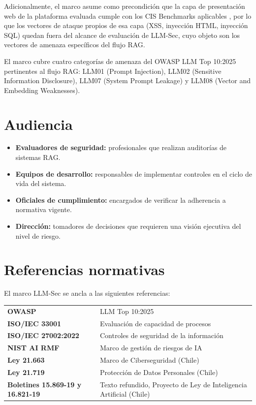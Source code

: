Adicionalmente, el marco asume como precondición que la capa de presentación web de la plataforma evaluada cumple con los CIS Benchmarks aplicables \cite{cisbenchmarks}, por lo que los vectores de ataque propios de esa capa (XSS, inyección HTML, inyección SQL) quedan fuera del alcance de evaluación de LLM-Sec, cuyo objeto son los vectores de amenaza específicos del flujo RAG.

El marco cubre cuatro categorías de amenaza del OWASP LLM Top 10:2025 pertinentes al flujo RAG: LLM01 (Prompt Injection), LLM02 (Sensitive Information Disclosure), LLM07 (System Prompt Leakage) y LLM08 (Vector and Embedding Weaknesses).

\section{Audiencia}

\begin{itemize}[leftmargin=2em]
  \item \textbf{Evaluadores de seguridad:} profesionales que realizan auditorías de sistemas RAG.
  \item \textbf{Equipos de desarrollo:} responsables de implementar controles en el ciclo de vida del sistema.
  \item \textbf{Oficiales de cumplimiento:} encargados de verificar la adherencia a normativa vigente.
  \item \textbf{Dirección:} tomadores de decisiones que requieren una visión ejecutiva del nivel de riesgo.
\end{itemize}

\section{Referencias normativas}

El marco LLM-Sec se ancla a las siguientes referencias:

\begin{infobox}[title=Referencias principales]
  \begin{tabularx}{\textwidth}{@{}l X@{}}
    \textbf{OWASP}              & LLM Top 10:2025 \\
    \textbf{ISO/IEC 33001}      & Evaluación de capacidad de procesos \\
    \textbf{ISO/IEC 27002:2022} & Controles de seguridad de la información \\
    \textbf{NIST AI RMF}        & Marco de gestión de riesgos de IA \\
    \textbf{Ley 21.663}         & Marco de Ciberseguridad (Chile) \\
    \textbf{Ley 21.719}         & Protección de Datos Personales (Chile) \\
    \textbf{Boletines 15.869-19 y 16.821-19} & Texto refundido, Proyecto de Ley de Inteligencia Artificial (Chile) \cite{leyiaproyecto} \\
  \end{tabularx}
\end{infobox}

